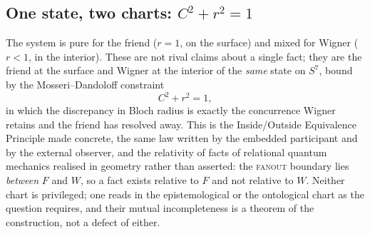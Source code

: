 \documentclass{article}
\begin{document}
\subsection{One state, two charts: \texorpdfstring{$C^{2}+r^{2}=1$}{C2+r2=1}}
\label{sec:wf-reconciliation}

The system is pure for the friend ($r=1$, on the surface) and mixed for Wigner
($r<1$, in the interior). These are not rival claims about a single fact; they are
the friend at the surface and Wigner at the interior of the \emph{same} state on
$S^{7}$, bound by the Mosseri--Dandoloff constraint
\begin{equation}
  C^{2}+r^{2}=1,
\end{equation}
in which the discrepancy in Bloch radius is exactly the concurrence Wigner
retains and the friend has resolved away. This is the Inside/Outside Equivalence
Principle made concrete, the same law written by the embedded participant and by
the external observer, and the relativity of facts of relational quantum
mechanics \autocite{Rovelli1996a} realised in geometry rather than asserted: the
\textsc{fanout} boundary lies \emph{between} $F$ and $W$, so a fact exists
relative to $F$ and not relative to $W$. Neither chart is privileged; one reads in
the epistemological or the ontological chart as the question requires, and their
mutual incompleteness is a theorem of the construction, not a defect of either.

\end{document}
